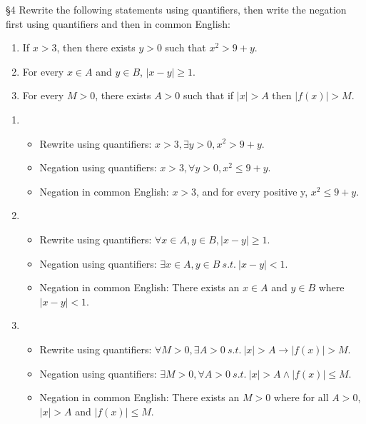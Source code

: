 \documentclass{homework}
\begin{document}
\begin{problem}{\S 4}
  Rewrite the following statements using quantifiers, then write the negation first using
  quantifiers and then in common English:
  \begin{enumerate}[label=(\alph*)]
    \item If $x>3$, then there exists $y>0$ such that $x^2>9+y$.
    \item For every $x\in A$ and $y\in B$, $\left| x-y \right| \ge 1$.
    \item For every $M>0$, there exists $A>0$ such that if $\left| x \right| > A$ then $\left| f(x)
      \right| > M$.
  \end{enumerate}
\end{problem}

\begin{solution}
 \begin{enumerate}[label=(\alph*)]
   \item 
     \begin{itemize}[label=]
       \item Rewrite using quantifiers: $x>3, \exists y>0, x^2>9+y$.
       \item Negation using quantifiers: $x>3, \forall y>0, x^2\le  9+y$.
       \item Negation in common English: $x>3$, and for every positive y, $x^2\le 9+y$.
     \end{itemize}
   \item 
     \begin{itemize}[label=]
       \item Rewrite using quantifiers: $\forall x\in A, y\in B, \left| x-y \right| \ge 1$.
       \item Negation using quantifiers: $ \exists x\in A, y\in B~s.t.~ \left| x-y \right| < 1$.
       \item Negation in common English: There exists an $x\in A$ and $y\in B$ where  $\left| x-y
         \right| <1$.
     \end{itemize}
   \item
     \begin{itemize}[label=]
       \item Rewrite using quantifiers: $\forall M>0, \exists A>0~s.t.~\left| x \right| > A \to
         \left| f(x) \right| > M$.
       \item Negation using quantifiers: $\exists M>0, \forall A>0~s.t.~ \left| x \right| > A \land
         \left| f(x) \right| \le  M$.
       \item Negation in common English: There exists an $M>0$ where for all $A>0$, $\left| x
         \right| > A$ and $\left| f(x) \right| \le  M$.
     \end{itemize}
 \end{enumerate} 
\end{solution}
\end{document}
